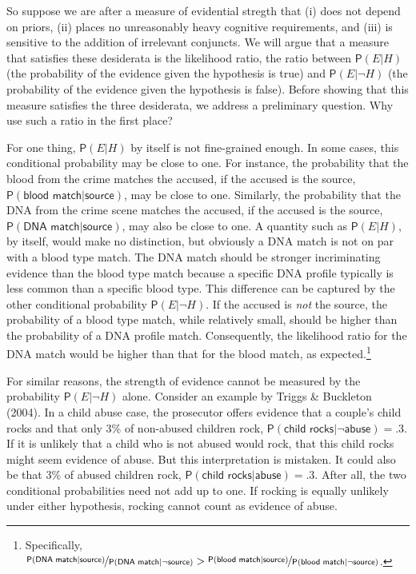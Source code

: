 \documentclass[
  10pt,
  dvipsnames,enabledeprecatedfontcommands]{scrartcl}
\newcommand{\pr}[1]{\mathsf{P}(#1)}
\begin{document}
So suppose we are after a measure of evidential stregth that (i) does
not depend on priors, (ii) places no unreasonably heavy cognitive
requirements, and (iii) is sensitive to the addition of irrelevant
conjuncts. We will argue that a measure that satisfies these desiderata
is the likelihood ratio, the ratio between \(\pr{E \vert H}\) (the
probability of the evidence given the hypothesis is true) and
\(\pr{E \vert \neg H}\) (the probability of the evidence given the
hypothesis is false). Before showing that this measure satisfies the
three desiderata, we address a preliminary question. Why use such a
ratio in the first place?

For one thing, \(\pr{E \vert H}\) by itself is not fine-grained enough.
In some cases, this conditional probability may be close to one. For
instance, the probability that the blood from the crime matches the
accused, if the accused is the source,
\(\pr{\textsf{blood match} \vert \textsf{source}}\), may be close to
one. Similarly, the probability that the DNA from the crime scene
matches the accused, if the accused is the source,
\(\pr{\textsf{DNA match} \vert \textsf{source}}\), may also be close to
one. A quantity such as \(\pr{E \vert H}\), by itself, would make no
distinction, but obviously a DNA match is not on par with a blood type
match. The DNA match should be stronger incriminating evidence than the
blood type match because a specific DNA profile typically is less common
than a specific blood type. This difference can be captured by the other
conditional probability \(\pr{E \vert \neg H}\). If the accused is
\textit{not} the source, the probability of a blood type match, while
relatively small, should be higher than the probability of a DNA profile
match. Consequently, the likelihood ratio for the DNA match would be
higher than that for the blood match, as expected.\footnote{Specifically,
  \(\nicefrac{\pr{\textsf{DNA match} \vert \textsf{source}}}{\pr{\textsf{DNA match} \vert \neg \textsf{source}}} > \nicefrac{\pr{\textsf{blood match} \vert \textsf{source}}}{\pr{\textsf{blood match} \vert \neg \textsf{source}}}\).}

For similar reasons, the strength of evidence cannot be measured by the
probability \(\pr{E \vert \neg H}\) alone. Consider an example by Triggs
\& Buckleton (2004). In a child abuse case, the prosecutor offers
\label{text:rock} evidence that a couple's child rocks and that only 3\%
of non-abused children rock,
\(\pr{\textsf{child rocks} \vert \neg \textsf{abuse}}=.3\). If it is
unlikely that a child who is not abused would rock, that this child
rocks might seem evidence of abuse. But this interpretation is mistaken.
It could also be that 3\% of abused children rock,
\(\pr{\textsf{child rocks} \vert \textsf{abuse}}=.3\). After all, the
two conditional probabilities need not add up to one. If rocking is
equally unlikely under either hypothesis, rocking cannot count as
evidence of abuse.
\end{document}
